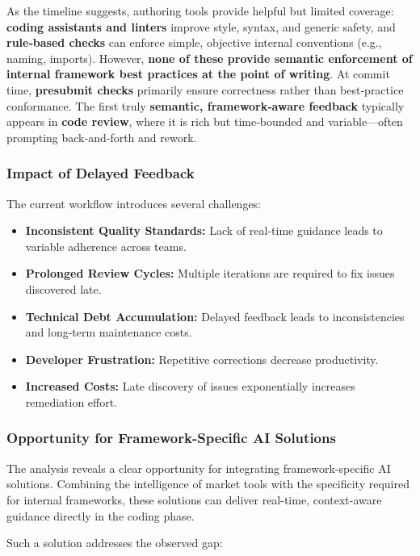 \begin{spacing}{1.2}
\noindent As the timeline suggests, authoring tools provide helpful but limited coverage: \textbf{coding assistants and linters} improve style, syntax, and generic safety, and \textbf{rule‑based checks} can enforce simple, objective internal conventions (e.g., naming, imports). However, \textbf{none of these provide semantic enforcement of internal framework best practices at the point of writing}. At commit time, \textbf{presubmit checks} primarily ensure correctness rather than best‑practice conformance. The first truly \textbf{semantic, framework‑aware feedback} typically appears in \textbf{code review}, where it is rich but time‑bounded and variable—often prompting back‑and‑forth and rework.

\subsubsection{Impact of Delayed Feedback}

The current workflow introduces several challenges:

\begin{itemize}
\item \textbf{Inconsistent Quality Standards:} Lack of real-time guidance leads to variable adherence across teams.
\item \textbf{Prolonged Review Cycles:} Multiple iterations are required to fix issues discovered late.
\item \textbf{Technical Debt Accumulation:} Delayed feedback leads to inconsistencies and long-term maintenance costs.
\item \textbf{Developer Frustration:} Repetitive corrections decrease productivity.
\item \textbf{Increased Costs:} Late discovery of issues exponentially increases remediation effort.
\end{itemize}

\subsubsection{Opportunity for Framework-Specific AI Solutions}

The analysis reveals a clear opportunity for integrating framework-specific AI solutions. Combining the intelligence of market tools with the specificity required for internal frameworks, these solutions can deliver real-time, context-aware guidance directly in the coding phase.

Such a solution addresses the observed gap:


\end{spacing}
